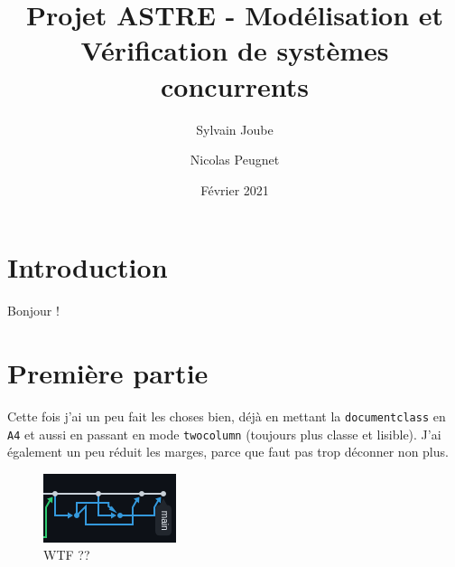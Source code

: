 \documentclass[a4paper,twocolumn,french]{article}
\title{Projet ASTRE - Modélisation et Vérification de systèmes concurrents}
\date{Février 2021}
\author{Sylvain Joube \and Nicolas Peugnet}
\begin{document}
\maketitle

\tableofcontents

\section*{Introduction}

Bonjour !

\section{Première partie}

Cette fois j'ai un peu fait les choses bien,
déjà en mettant la \verb|documentclass| en \verb|A4| et aussi en passant en mode \verb|twocolumn|
(toujours plus classe et lisible).
J'ai également un peu réduit les marges, parce que faut pas trop déconner non plus.

\begin{figure}[h]
	\centering
	\includegraphics[width=0.4\linewidth]{wtf.png} %
	\caption{WTF ??\protect\footnotemark}
	\label{fig:wtf}
\end{figure}
\end{document}
